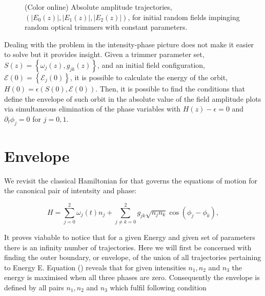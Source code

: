 \documentclass[9pt,twocolumn,twoside]{osajnl}
\begin{document}
\begin{figure}[htbp]
\centering
{}
\caption{(Color online) Absolute amplitude trajectories, $(\vert E_{0}(z) \vert, \vert E_{1}(z) \vert, \vert E_{2}(z) \vert )$, for initial random fields impinging random optical trimmers with constant parameters.}
\label{fig: Fig2}
\end{figure}

Dealing with the problem in the intensity-phase picture does not make it easier to solve but it provides insight.
Given a trimmer parameter set, $S(z) = \left\{ \omega_{j}(z), g_{jk}(z) \right\}$, and an initial field configuration, $\mathcal{E}(0) = \left\{ \mathcal{E}_{j}(0) \right\}$, it is possible to calculate the energy of the orbit, $H(0) = \epsilon\left(S(0), \mathcal{E(0)}\right)$. Then, it is possible to find the conditions that define the envelope of such orbit in the absolute value of the field amplitude plots via simultaneous elimination of the phase variables with $H(z) - \epsilon = 0 $ and $\partial_t \phi_j = 0$ for $j= 0,1$.


\section{Envelope}

We revisit the classical Hamiltonian for that governs the 
equations of motion for the canonical pair of intentsity and 
phase:

\begin{equation} 
H = \sum_{j=0}^{2} \omega_{j}(t) n_{j}  
+ \sum_{j \neq k = 0}^{2} g_{jk} \sqrt{n_{j} n_{k}} \cos \left( \phi_{j} - \phi_{k} \right),\label{eq:clhamm}	
\end{equation}

It proves viabable to notice that for a given Energy and 
given set of parameters there is an infinity number of trajectories.
Here we will first be concerned with finding the outer boundary, or 
envelope, of the union of all trajectories pertaining to Energy 
E. 
Equation (\cite{eq:clhamm}) reveals that for given intensities 
$n_1,n_2$ and $n_3$ the energy is maximised when all three phases
are zero. Consequently the envelope is defined by all pairs
$n_1,n_2$ and $n_3$ which fulfil following condition
\end{document}
